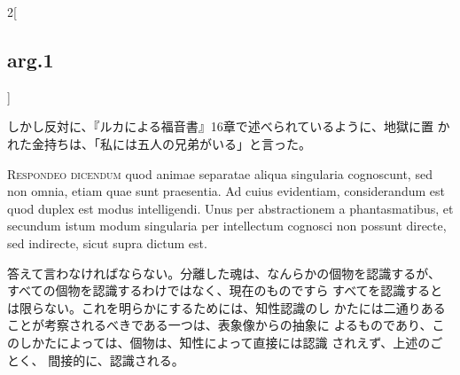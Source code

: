 \documentclass[paper=a4paper,fontsize=10pt,jafontsize=9pt,titlepage]{jlreq}
\begin{document}
\begin{paracol}{2}[\subsection{arg.1}]
\switchcolumn

しかし反対に、『ルカによる福音書』16章で述べられているように、地獄に置
かれた金持ちは、「私には五人の兄弟がいる」と言った。


{\scshape Respondeo dicendum} quod animae separatae aliqua singularia
cognoscunt, sed non omnia, etiam quae sunt praesentia. Ad cuius
evidentiam, considerandum est quod duplex est modus intelligendi. Unus
per abstractionem a phantasmatibus, et secundum istum modum singularia
per intellectum cognosci non possunt directe, sed indirecte, sicut
supra dictum est.

\switchcolumn

答えて言わなければならない。分離した魂は、なんらかの個物を認識するが、
すべての個物を認識するわけではなく、現在のものですら
すべてを認識するとは限らない。これを明らかにするためには、知性認識のし
かたには二通りあることが考察されるべきである一つは、表象像からの抽象に
よるものであり、このしかたによっては、個物は、知性によって直接には認識
されえず、上述のごとく、
間接的に、認識される。


\end{paracol}
\end{document}
